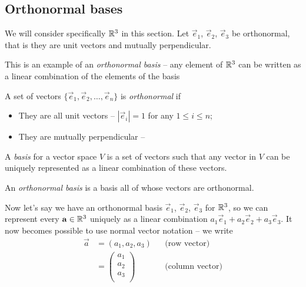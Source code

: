 \documentclass{../template/note}
\begin{document}
    \subsection{Orthonormal bases}

    We will consider specifically \(\mathbb R^3\) in this section. Let \(\vec e_1\), \(\vec e_2\), \(\vec e_3\) be orthonormal, that is they are unit vectors and mutually perpendicular.

    This is an example of an \emph{orthonormal basis} -- any element of \(\mathbb R^3\) can be written as a linear combination of the elements of the basis

    \begin{definition}
        A set of vectors \(\{\vec e_1, \vec e_2, \dots, \vec e_n\}\) is \emph{orthonormal} if
        \begin{itemize}
            \item They are all unit vectors -- \(|\vec e_i| = 1\) for any \(1 \leq i \leq n\);
            \item They are mutually perpendicular --
            
            
        \end{itemize}
        
        
    \end{definition}
    
    \begin{definition}
        A \emph{basis} for a vector space \(V\) is a set of vectors such that any vector in \(V\) can be uniquely represented as a linear combination of these vectors.
    \end{definition}

    \begin{definition}
        An \emph{orthonormal basis} is a basis all of whose vectors are orthonormal.
    \end{definition}
    
    Now let's say we have an orthonormal basis \(\vec e_1\), \(\vec e_2\), \(\vec e_3\) for \(\mathbb R^3\), so we can represent every \(\vec a \in \RR^3\) uniquely as a linear combination \(a_1 \vec e_1 + a_2 \vec e_2 + a_3 \vec e_3\). It now becomes possible to use normal vector notation -- we write
    \begin{align*}
        \vec a &= (a_1, a_2, a_3) && \text{(row vector)} \\
        &= \begin{pmatrix}
         a_1 \\
         a_2 \\
         a_3 \\
        \end{pmatrix} && \text{(column vector)}
    \end{align*}
    
\end{document}

